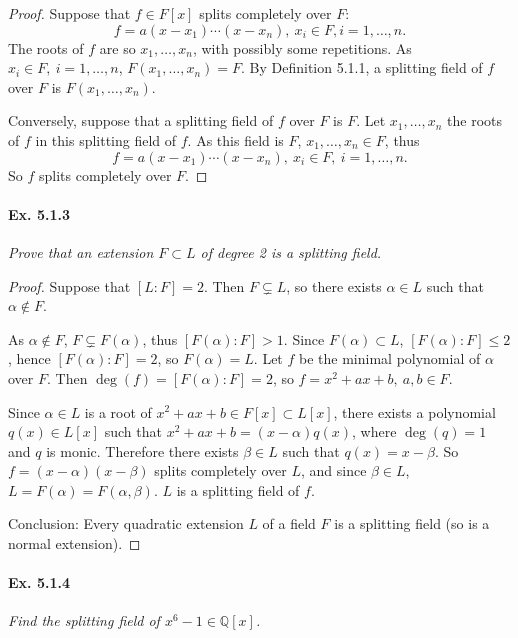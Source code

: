 \documentclass[11pt,a4paper]{article}
\newcommand{\Q}{\mathbb{Q}}
\begin{document}
\begin{proof}
Suppose that $f \in F[x]$ splits completely over $F$:
$$f = a(x-x_1)\cdots(x-x_n), \ x_i \in F,i=1,\ldots,n.$$
The roots of $f$ are so $x_1,\ldots, x_n$, with possibly some repetitions. As $x_i \in F,\ i=1,\ldots,n$, $F(x_1,\ldots,x_n) = F$.
By Definition 5.1.1, a splitting field of $f$ over $F$ is  $F(x_1,\ldots,x_n)$. 

Conversely, suppose that a splitting field of $f$ over $F$ is $F$. Let $x_1,\ldots,x_n$ the roots of $f$ in this splitting field of $f$. As this field is $F$, $x_1,\ldots ,x_n \in F$, thus
$$f = a(x-x_1)\cdots(x-x_n), \ x_i \in F,\ i=1,\ldots,n.$$
So $f$ splits completely over $F$.
\end{proof}

\paragraph{Ex. 5.1.3}

{\it Prove that an extension $F\subset L$ of degree 2 is a splitting field.
}

\begin{proof}
Suppose that $[L:F]=2$. Then $F\subsetneq L$, so there exists $\alpha \in L$  such that $\alpha \not \in F$.

As $\alpha \not \in F$, $F \subsetneq F(\alpha)$, thus $[F(\alpha):F]>1$. Since $F(\alpha) \subset L$, $[F(\alpha):F]\leq 2$, hence $[F(\alpha):F] =  2$, so $F(\alpha) = L$.
Let $f$ be the minimal polynomial of $\alpha$ over $F$. Then $\deg(f) =[F(\alpha):F] =  2$, so $f = x^2+ax+b,\ a,b\in F$.

Since $\alpha \in L$ is a root of $x^2 +ax +b \in F[x] \subset L[x]$, there exists a polynomial $q(x) \in L[x]$ such that $x^2 +a x + b = (x- \alpha)q(x)$, where $\deg(q) = 1$ and $q$ is monic. Therefore there exists $\beta \in L$ such that $q(x) = x- \beta$. So $f = (x-\alpha)(x-\beta)$ splits completely over $L$, and since $\beta \in L$,  $L = F(\alpha) = F(\alpha,\beta)$. $L$ is a splitting field of $f$.

Conclusion: Every quadratic extension $L$ of a field $F$ is a splitting field (so is a normal extension).
\end{proof}


\paragraph{Ex. 5.1.4}

{\it Find the splitting field of $x^6-1 \in \Q[x]$.
}
\end{document}
